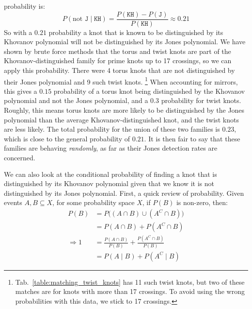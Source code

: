 \documentclass{article}
\theoremstyle{plain}
\begin{document}
        probability is:
        \begin{equation}
            P(\textrm{not }\texttt{J}\;|\;\texttt{KH})
            =\frac{P(\texttt{KH})-P(\texttt{J})}{P(\texttt{KH})}
            \approx{0.21}
        \end{equation}
        So with a $0.21$ probability a knot that is known to be distinguished by
        its Khovanov polynomial will not be distinguished by its Jones polynomial.
        We have shown by brute force methods that the torus and twist knots are
        part of the Khovanov-distinguished family for prime knots up to 17
        crossings, so we can apply this probability. There were 4 torus knots that
        are not distinguished by their Jones polynomial and 9 such twist knots.%
        \footnote{%
            Tab.~\ref{table:matching_twist_knots} has 11 such twist knots, but
            two of these matches are for knots with more than 17 crossings. To
            avoid using the wrong probabilities with this data, we stick to
            17 crossings.
        }
        When accounting for mirrors, this gives a
        $0.15$ probability of a torus knot being distinguished by the Khovanov
        polynomial and not the Jones polynomial, and a $0.3$ probability for twist
        knots. Roughly, this means torus knots are more likely to be distinguished
        by the Jones polynomial than the average Khovanov-distinguished knot,
        and the twist knots are less likely. The total probability for the union
        of these two families is $0.23$, which is close to the general
        probability of $0.21$. It is then fair to say that these
        families are behaving \textit{randomly}, as far as their
        Jones detection rates are concerned.
        \par\hfill\par
        We can also look at the conditional probability of finding a knot that is
        distinguished by its Khovanov polynomial given that we know it is not
        distinguished by its Jones polynomial. First, a quick review of probability.
        Given events $A,B\subseteq{X}$, for some probability space $X$, if $P(B)$
        is non-zero, then:
        \begin{align}
            P(B)&=P\big((A\cap{B})\cup(A^{C}\cap{B})\big)\\
            &=P(A\cap{B})+P(A^{C}\cap{B})\\
            \Rightarrow
            1&=\frac{P(A\cap{B})}{P(B)}+\frac{P(A^{C}\cap{B})}{P(B)}\\
            &=P(A\;|\;B)+P(A^{C}\;|\;B)
        \end{align}
\end{document}
